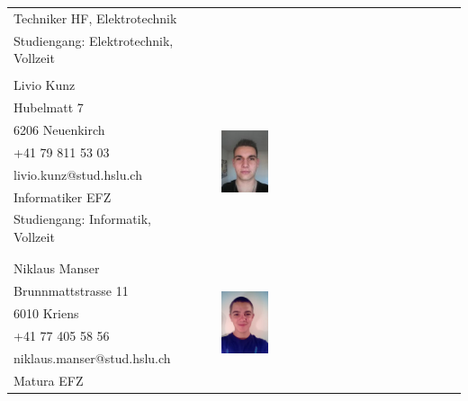 \begin{tabular}{lp{3.3cm}l}
    Techniker HF, Elektrotechnik                & &  \\
    Studiengang: Elektrotechnik, Vollzeit       & &  \\
                                                & &  \\
    Livio Kunz                                  & &  \multirow{8}{4cm}{\includegraphics[width=0.2\textwidth]{DasTeam/Bilder/LivioKunz.jpg}} \\
    Hubelmatt 7                                 & &  \\
    6206 Neuenkirch                             & &  \\
    +41 79 811 53 03                            & &  \\
    livio.kunz@stud.hslu.ch                     & &  \\
    Informatiker EFZ                            & &  \\
    Studiengang: Informatik, Vollzeit 			& &  \\
                                                & &  \\
                                                & &  \\
    Niklaus Manser                              & &  \multirow{8}{4cm}{\includegraphics[width=0.2\textwidth]{DasTeam/Bilder/NiklausManser.jpg}} \\
    Brunnmattstrasse 11                         & &  \\
    6010 Kriens                                 & &  \\
    +41 77 405 58 56                            & &  \\
    niklaus.manser@stud.hslu.ch                 & &  \\
    Matura EFZ                    			    & &  \\

\end{tabular}
